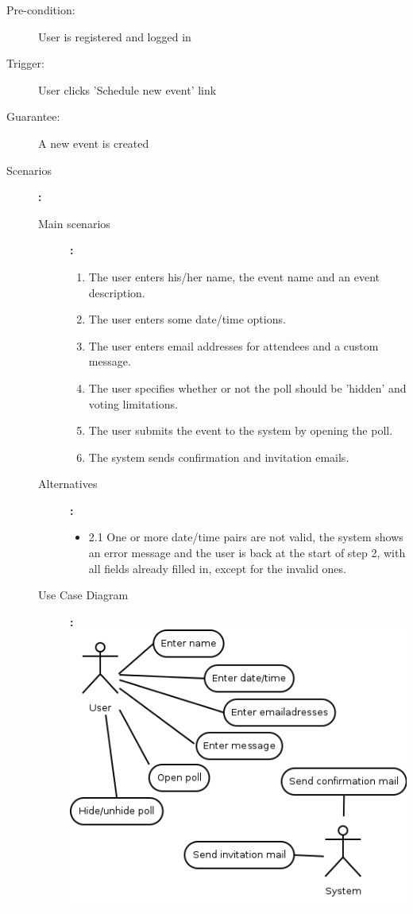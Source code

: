 \begin{description}
	\item[Pre-condition:] User is registered and logged in
	\item[Trigger:] User clicks 'Schedule new event' link
	\item[Guarantee:] A new event is created
	\item[Scenarios]\textbf{:}\\
				\begin{description}
					\item[Main scenarios]\textbf{:}\\
								\begin{enumerate}
									\item The user enters his/her name, the event name and an event description.
									\item The user enters some date/time options.
									\item The user enters email addresses for attendees and a custom message.
									\item The user specifies whether or not the poll should be 'hidden' and voting limitations.
									\item The user submits the event to the system by opening the poll.
									\item The system sends confirmation and invitation emails.
								\end{enumerate}
					\item[Alternatives]\textbf{:}\\
								\begin{itemize}
									\item 2.1 One or more date/time pairs are not valid, the system shows an error message and the user is back at the start of step 2, with all fields already filled in, except for the invalid ones.
								\end{itemize}
					\item[Use Case Diagram]\textbf{:}\\
						\includegraphics[scale=0.5]{ucd/Diagram1.png}\\
				\end{description}
\end{description}


